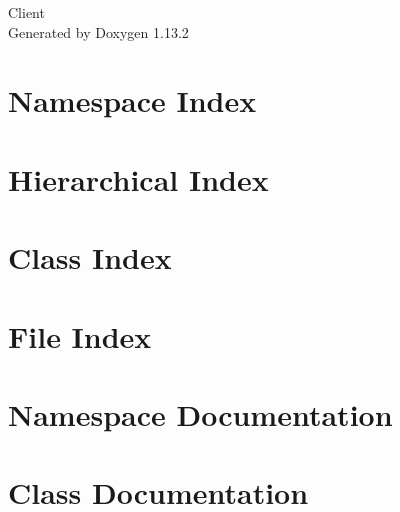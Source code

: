 \documentclass[twoside]{book}
\newcommand{\+}{\discretionary{\mbox{\scriptsize$\hookleftarrow$}}{}{}}
\newcommand{\clearemptydoublepage}{%
    \newpage{\pagestyle{empty}\cleardoublepage}%
  }
\begin{document}
  \raggedbottom
    \hypersetup{pageanchor=false,
                bookmarksnumbered=true,
                pdfencoding=unicode
               }
  \begin{titlepage}
  \vspace*{7cm}
  \begin{center}%
  {\Large Client}\\
  \vspace*{1cm}
  {\large Generated by Doxygen 1.13.2}\\
  \end{center}
  \end{titlepage}
  \clearemptydoublepage
  \tableofcontents
  \clearemptydoublepage
  \hypersetup{pageanchor=true}
\chapter{Namespace Index}

\chapter{Hierarchical Index}

\chapter{Class Index}

\chapter{File Index}

\chapter{Namespace Documentation}

\chapter{Class Documentation}















\end{document}
